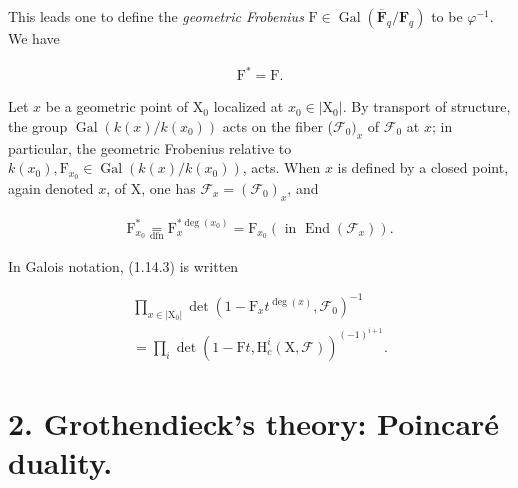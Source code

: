\documentclass[10pt,leqno]{article}
\begin{document}
\noindent This leads one to define the \emph{geometric Frobenius} \(\mathrm{F}\in \operatorname{Gal}(\overline{\mathbf{F}}_{q}/\mathbf{F}_{q})\) to be \(\varphi ^{- 1}\). We have\par

\begin{equation*}\begin{gathered}\mathrm{F}^{*} = \mathrm{F}.\end{gathered}\tag{1.15.1}\end{equation*}

\noindent Let \(x\) be a geometric point of \(\mathrm{X}_{0}\) localized at \(x_{0}\in |\mathrm{X}_{0}|\). By transport of structure, the group \(\operatorname{Gal}(k(x)/k(x_{0}))\) acts on the fiber (\(\mathcal{F} _{0})_{x}\) of \(\mathcal{F} _{0}\) at \(x\); in particular, the geometric Frobenius relative to \(k(x_{0}), \mathrm{F}_{x_{0}}\in \operatorname{Gal}(k(x)/k(x_{0}))\), acts. When \(x\) is defined by a closed point, again denoted \(x\), of \(\mathrm{X}\), one has \(\mathcal{F} _{x}=(\mathcal{F} _{0})_{x}\), and\par

\begin{equation*}\begin{gathered}\mathrm{F}_{x_{0}}^{*} \underset{\mathrm{dfn}}{=} \mathrm{F}_{x}^{*\operatorname{deg}(x_{0})} = \mathrm{F}_{x_{0}}    (\text{ in }\operatorname{End}(\mathcal{F} _{x})).\end{gathered}\tag{1.15.2}\end{equation*}

\noindent In Galois notation, (1.14.3) is written\par

\begin{equation*}\begin{gathered}\prod _{x\in |\mathrm{X}_{0}|} \operatorname{det}(1- \mathrm{F}_{x} t^{\operatorname{deg}(x)},\mathcal{F} _{0})^{- 1} \\ = \prod _{i} \operatorname{det}(1- \mathrm{F}t,\mathrm{H}_{c}^{i}(\mathrm{X},\mathcal{F} ))^{(- 1)^{i+1}}.\end{gathered}\end{equation*}

\clearpage

\label{physical-9}\par\smallskip

\section*{2. Grothendieck’s theory: Poincaré duality.}
\end{document}
